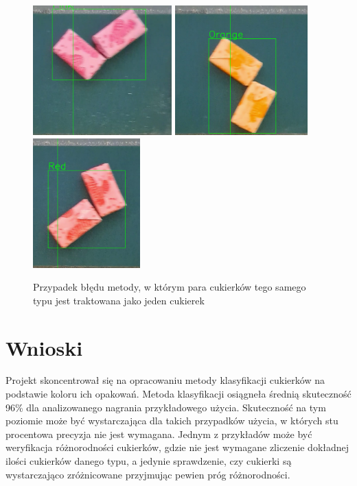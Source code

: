 \documentclass{article}
\begin{document}
\begin{center}
\begin{figure}[H]
\includegraphics[height=5cm]{pink.png}
\includegraphics[height=5cm]{orange.png}
\includegraphics[height=5cm]{red.png}
\caption{Przypadek błędu metody, w którym para cukierków tego samego typu jest traktowana jako jeden cukierek}
\end{figure}
\end{center}

\section{Wnioski}
\label{Wnioski}

Projekt skoncentrował się na opracowaniu metody klasyfikacji cukierków na podstawie koloru ich opakowań. Metoda klasyfikacji osiągneła średnią skuteczność 96\% dla analizowanego nagrania przykładowego użycia. Skuteczność na tym poziomie może być wystarczająca dla takich przypadków użycia, w których stu procentowa precyzja nie jest wymagana. Jednym z przykładów może być weryfikacja różnorodności cukierków, gdzie nie jest wymagane zliczenie dokładnej ilości cukierków danego typu, a jedynie sprawdzenie, czy cukierki są wystarczająco zróżnicowane przyjmując pewien próg różnorodności.
\end{document}
